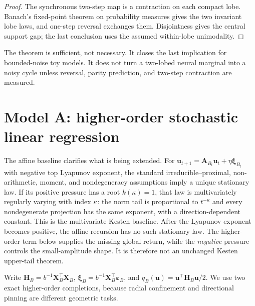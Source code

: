 \documentclass[10pt]{article}
\theoremstyle{definition}
\theoremstyle{remark}
\newcommand{\uvec}{\mathbf u}
\newcommand{\Hvec}{\mathbf H}
\newcommand{\Avec}{\mathbf A}
\newcommand{\xivec}{\boldsymbol\xi}
\begin{document}
\begin{proof}
The synchronous two-step map is a contraction on each compact lobe.
Banach's fixed-point theorem on probability measures gives the two invariant
lobe laws, and one-step reversal exchanges them.  Disjointness gives the
central support gap; the last conclusion uses the assumed within-lobe
unimodality.
\end{proof}

The theorem is sufficient, not necessary.  It closes the last implication
for bounded-noise toy models.  It does not turn a two-lobed neural marginal
into a noisy cycle unless reversal, parity prediction, and two-step
contraction are measured.

\section{Model A: higher-order stochastic linear regression}

The affine baseline clarifies what is being extended.  For
$\uvec_{t+1}=\Avec_{B_t}\uvec_t+\eta\xivec_{B_t}$ with negative top
Lyapunov exponent, the standard irreducible--proximal, non-arithmetic,
moment, and nondegeneracy assumptions imply a unique stationary law.  If its
positive pressure has a root $k(\kappa)=1$, that law is multivariately
regularly varying with index $\kappa$: the norm tail is proportional to
$t^{-\kappa}$ and every nondegenerate projection has the same exponent, with
a direction-dependent constant.  This is the multivariate Kesten baseline.
After the Lyapunov exponent becomes positive, the affine recursion has no
such stationary law.  The higher-order term below supplies the missing global
return, while the \emph{negative} pressure controls the small-amplitude shape.
It is therefore not an unchanged Kesten upper-tail theorem.

Write $\Hvec_B=b^{-1}\mathbf X_B^\top\mathbf X_B$,
$\xivec_B=b^{-1}\mathbf X_B^\top\boldsymbol\varepsilon_B$, and
$q_B(\uvec)=\uvec^\top\Hvec_B\uvec/2$.  We use two exact higher-order
completions, because radial confinement and directional pinning are different
geometric tasks.
\end{document}

